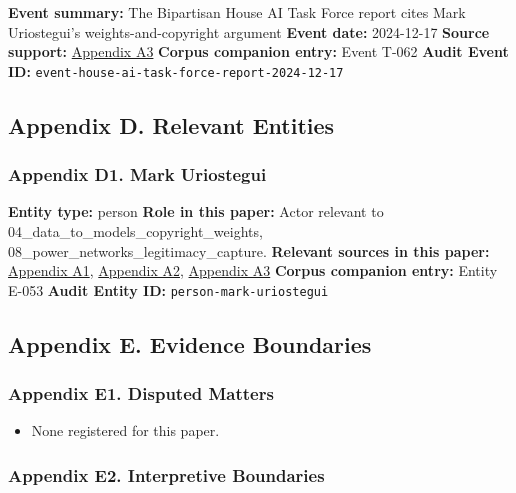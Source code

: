 \documentclass[
  american,
  11pt,
  letterpaper,
]{article}
\providecommand{\tightlist}{%
  \setlength{\itemsep}{0pt}\setlength{\parskip}{0pt}}
\begin{document}
\textbf{Event summary:} The Bipartisan House AI Task Force report cites
Mark Uriostegui's weights-and-copyright argument \textbf{Event date:}
2024-12-17 \textbf{Source support:}
\hyperref[ch-00-appendix-a3-bipartisan-house-task-force-report-on-artificial-intelligence]{Appendix
A3} \textbf{Corpus companion entry:} Event T-062 \textbf{Audit Event
ID:} \texttt{event-house-ai-task-force-report-2024-12-17}

\subsection{Appendix D. Relevant
Entities}\label{appendix-d.-relevant-entities}

\subsubsection{Appendix D1. Mark
Uriostegui}\label{ch-00-appendix-d1-mark-uriostegui}

\textbf{Entity type:} person \textbf{Role in this paper:} Actor relevant
to 04\_data\_to\_models\_copyright\_weights,
08\_power\_networks\_legitimacy\_capture. \textbf{Relevant sources in
this paper:}
\hyperref[ch-00-appendix-a1-ai-copyright-weights-a-new-frontier-in-intellectual-property-law]{Appendix
A1},
\hyperref[ch-00-appendix-a2-how-ai-is-ruining-your-life-to-build-an-empire]{Appendix
A2},
\hyperref[ch-00-appendix-a3-bipartisan-house-task-force-report-on-artificial-intelligence]{Appendix
A3} \textbf{Corpus companion entry:} Entity E-053 \textbf{Audit Entity
ID:} \texttt{person-mark-uriostegui}

\subsection{Appendix E. Evidence
Boundaries}\label{appendix-e.-evidence-boundaries}

\subsubsection{Appendix E1. Disputed
Matters}\label{ch-00-appendix-e1-disputed-matters}

\begin{itemize}
\tightlist
\item
  None registered for this paper.
\end{itemize}

\subsubsection{Appendix E2. Interpretive
Boundaries}\label{ch-00-appendix-e2-interpretive-boundaries}
\end{document}
